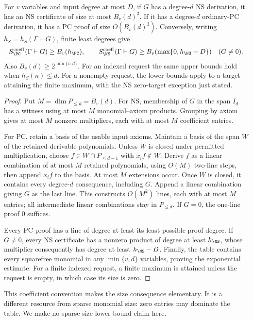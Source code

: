 \begin{lemma}\label{lem:dense-size}
For $v$ variables and input degree at most $D$, if $G$ has a degree-$d$
NS derivation, it has an NS certificate of size at most $B_v(d)^2$.
If it has a degree-$d$ ordinary-PC derivation, it has a PC proof of
size $O(B_v(d)^3)$. Conversely,
writing $h_S=h_S(\Gamma\vdash G)$, finite least degrees give
\[
 S^{\mathrm{coeff}}_{\PC}(\Gamma\vdash G)\ge B_v(h_{\PC}),\qquad
 S^{\mathrm{coeff}}_{\NS}(\Gamma\vdash G)
                \ge B_v(\max\{0,h_{\NS}-D\})\quad(G\ne0).
\]
Also $B_v(d)\ge2^{\min\{v,d\}}$. For an indexed request the same upper
bounds hold when $h_S(n)\le d$. For a nonempty request, the lower
bounds apply to a target attaining the finite maximum, with the NS
zero-target exception just stated.
\end{lemma}
\begin{proof}
Put $M=\dim P_{\le d}=B_v(d)$. For NS, membership of $G$ in the span
$I_d$ has a witness using at most $M$ monomial--axiom products.
Grouping by axiom gives at most $M$ nonzero multipliers, each with at
most $M$ coefficient entries.

For PC, retain a basis of the usable input axioms. Maintain a basis of
the span $W$ of the retained derivable polynomials. Unless $W$ is
closed under permitted multiplication, choose
$f\in W\cap P_{\le d-1}$ with $x_if\notin W$. Derive $f$ as a linear
combination of at most $M$ retained polynomials, using $O(M)$ two-line
steps, then append $x_if$ to
the basis. At most $M$ extensions occur. Once $W$ is closed, it contains
every degree-$d$ consequence, including $G$. Append a linear
combination giving $G$ as the last line. This constructs $O(M^2)$
lines, each with at most $M$ entries; all intermediate linear
combinations stay in $P_{\le d}$. If $G=0$, the one-line proof $0$
suffices.

Every PC proof has a line of degree at least its least possible proof
degree. If $G\ne0$, every NS certificate has a nonzero product of
degree at least $h_{\NS}$, whose multiplier consequently has degree at
least $h_{\NS}-D$. Finally, the table contains every squarefree
monomial in any $\min\{v,d\}$ variables, proving the exponential
estimate. For a finite indexed request, a finite maximum is attained
unless the request is empty, in which case its size is zero.
\end{proof}

This coefficient convention makes the size consequence elementary.
It is a different resource from sparse monomial size: zero entries may
dominate the table. We make no sparse-size lower-bound claim here.
